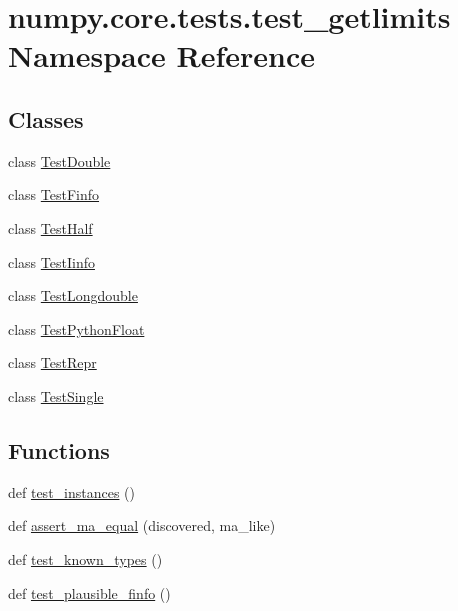 \hypertarget{namespacenumpy_1_1core_1_1tests_1_1test__getlimits}{}\section{numpy.\+core.\+tests.\+test\+\_\+getlimits Namespace Reference}
\label{namespacenumpy_1_1core_1_1tests_1_1test__getlimits}
\subsection*{Classes}
\begin{DoxyCompactItemize}
\item 
class \hyperlink{classnumpy_1_1core_1_1tests_1_1test__getlimits_1_1TestDouble}{Test\+Double}
\item 
class \hyperlink{classnumpy_1_1core_1_1tests_1_1test__getlimits_1_1TestFinfo}{Test\+Finfo}
\item 
class \hyperlink{classnumpy_1_1core_1_1tests_1_1test__getlimits_1_1TestHalf}{Test\+Half}
\item 
class \hyperlink{classnumpy_1_1core_1_1tests_1_1test__getlimits_1_1TestIinfo}{Test\+Iinfo}
\item 
class \hyperlink{classnumpy_1_1core_1_1tests_1_1test__getlimits_1_1TestLongdouble}{Test\+Longdouble}
\item 
class \hyperlink{classnumpy_1_1core_1_1tests_1_1test__getlimits_1_1TestPythonFloat}{Test\+Python\+Float}
\item 
class \hyperlink{classnumpy_1_1core_1_1tests_1_1test__getlimits_1_1TestRepr}{Test\+Repr}
\item 
class \hyperlink{classnumpy_1_1core_1_1tests_1_1test__getlimits_1_1TestSingle}{Test\+Single}
\end{DoxyCompactItemize}
\subsection*{Functions}
\begin{DoxyCompactItemize}
\item 
def \hyperlink{namespacenumpy_1_1core_1_1tests_1_1test__getlimits_a7252aa3e3a221666df03d561a409af5c}{test\+\_\+instances} ()
\item 
def \hyperlink{namespacenumpy_1_1core_1_1tests_1_1test__getlimits_ab69e32fe7062338ee9857cf001c36bc0}{assert\+\_\+ma\+\_\+equal} (discovered, ma\+\_\+like)
\item 
def \hyperlink{namespacenumpy_1_1core_1_1tests_1_1test__getlimits_ab238881b40a8befcc69b12d6868f1307}{test\+\_\+known\+\_\+types} ()
\item 
def \hyperlink{namespacenumpy_1_1core_1_1tests_1_1test__getlimits_a08ec918bfc0a5d324e121ce3fa75e64f}{test\+\_\+plausible\+\_\+finfo} ()
\end{DoxyCompactItemize}


